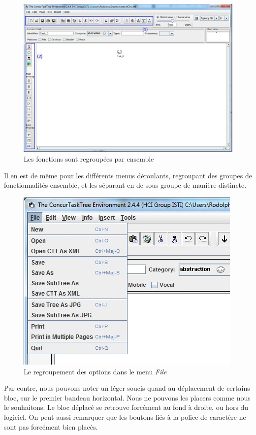 \documentclass[12pt, a4paper]{article}
\begin{document}
\begin{figure}[h]
\begin{center}
   \includegraphics[scale = 0.5]{groupement.jpg}
	\caption{Les fonctions sont regroupées par ensemble}
	\end{center}
\end{figure}
Il en est de même pour les différents menus déroulants, regroupant des groupes de fonctionnalités ensemble, et les séparant en de sous groupe de manière distincte.
\begin{figure}[h]
\begin{center}
   \includegraphics[scale = 0.5]{menusderoulant.jpg}
	\caption{Le regroupement des options dans le menu \emph{File}}
	\end{center}
\end{figure}

\newpage
Par contre, nous pouvons noter un léger soucis quand au déplacement de certains bloc, sur le premier bandeau horizontal. Nous ne pouvons les placers comme nous le souhaitons. Le bloc déplacé se retrouve forcément au fond à droite, ou hors du logiciel. On peut aussi remarquer que les boutons liés à la police de caractère ne sont pas forcément bien placés.\\ 
\end{document}
